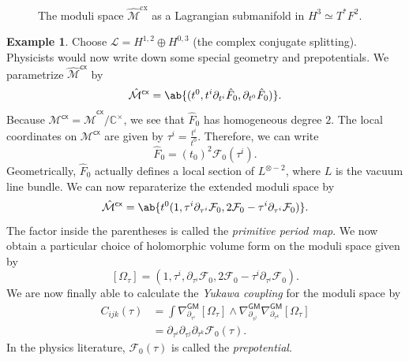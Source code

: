 \documentclass[article,10pt,oneside,oldfontcommands]{memoir}
\theoremstyle{definition}
\newtheorem{exm}[thm]{Example}
\theoremstyle{remark}
\theoremstyle{plain}
\theoremstyle{definition}
\theoremstyle{remark}
\newcommand{\C}{\mathbb{C}}
\newcommand{\mc}[1]{\mathcal{#1}}
\newcommand{\ms}[1]{\mathsf{#1}}
\newcommand{\1}{\mathbf{1}}
\newcommand{\2}{\mathbf{2}}
\newcommand{\3}{\mathbf{3}}
\begin{document}
\begin{figure}[htpb]
\begin{center}
\end{center}
\caption{The moduli space \(\hat{\mathcal M}^{\mathrm{cx}}\) as a Lagrangian submanifold in \(H^3 \simeq T^* F^2\).}%
\label{fig:lagrangian_submanifold}
\end{figure}

\begin{exm}
    Choose \(\mc{L} = H^{1,2} \oplus H^{0,3}\) (the complex conjugate splitting). Physicists would now write down some special geometry and prepotentials. We parametrize \(\hat{\mc{M}}^{\ms{cx}}\) by
    \[ \hat{\mc{M}}^{\ms{cx}} = \ab\{ (t^0, t^i \partial_{t^i} \hat{F}_0, \partial_{t^0} \hat{F}_0) \}. \]
    Because \(\mc{M}^{\ms{cx}} = \hat{\mc{M}}^{\ms{cx}} / \C^{\times}\), we see that \(\hat{F}_0\) has homogeneous degree \(2\). The local coordinates on \(\mc{M}^{\ms{cx}}\) are given by \(\tau^i = \frac{t^i}{t^0}\). Therefore, we can write
    \[ \hat{F}_0 = (t_0)^2 \mc{F}_0 (\tau^i). \]
    Geometrically, \(\hat{F}_0\) actually defines a local section of \(L^{\otimes -2}\), where \(L\) is the vacuum line bundle. We can now reparaterize the extended moduli space by
    \[ \hat{\mc{M}}^{\ms{cx}} = \ab\{ t^0 (1, \tau^i \partial_{\tau^i} \mc{F}_0, 2 \mc{F}_0 - \tau^i \partial_{\tau^i} \mc{F}_0) \}. \]
    The factor inside the parentheses is called the \textit{primitive period map}. We now obtain a particular choice of holomorphic volume form on the moduli space given by
    \[ [\Omega_{\tau}] = (1, \tau^i, \partial_{\tau^i} \mc{F}_0, 2 \mc{F}_0 - \tau^i \partial_{\tau^i} \mc{F}_0). \]
    We are now finally able to calculate the \textit{Yukawa coupling} for the moduli space by
    \begin{align*}
        C_{ijk}(\tau) &= \int \nabla^{\ms{GM}}_{\partial_{\tau^i}} [\Omega_{\tau}] \wedge \nabla^{\ms{GM}}_{\partial_{\tau^j}} \nabla^{\ms{GM}}_{\partial_{\tau^k}} [\Omega_{\tau}] \\
        &= \partial_{\tau^i} \partial_{\tau^j} \partial_{\tau^k} \mc{F}_0 (\tau).
    \end{align*}
    In the physics literature, \(\mc{F}_0(\tau)\) is called the \textit{prepotential}.
\end{exm}
\end{document}
